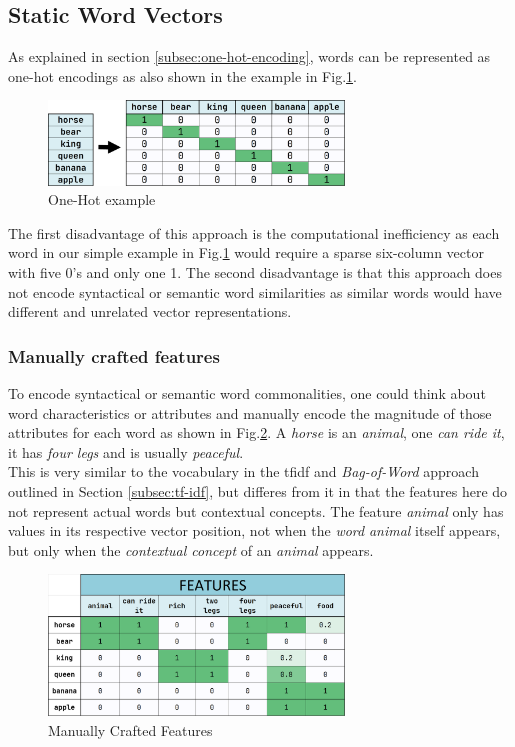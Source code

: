 \subsection{Static Word Vectors}\label{subsec:static-word-vectors}

As explained in section \ref{subsec:one-hot-encoding}, words can be represented as one-hot encodings as also shown in the example in Fig.\ref{fig:onehot}.

\begin{figure}[H]
	\centering
	\includegraphics[width=0.7\textwidth]{Assets/onehot}
	\caption{One-Hot example}
	\label{fig:onehot}
\end{figure}

The first disadvantage of this approach is the computational inefficiency as each word in our simple example in Fig.\ref{fig:onehot} would require a sparse six-column vector with five 0's and only one 1.
The second disadvantage is that this approach does not encode syntactical or semantic word similarities as similar words would have different and unrelated vector representations.

\subsubsection{Manually crafted features}
To encode syntactical or semantic word commonalities, one could think about word characteristics or attributes and manually encode the magnitude of those attributes for each word as shown in Fig.\ref{fig:wordfeaturesmanually}.
A \emph{horse} is an \emph{animal}, one \emph{can ride it}, it has \emph{four legs} and is usually \emph{peaceful}.\\
This is very similar to the \gls{vocabulary} in the \gls{tfidf} and \emph{Bag-of-Word} approach outlined in Section \ref{subsec:tf-idf}, but differes from
it in that the features here do not represent actual words but contextual concepts.
The feature \emph{animal} only has values in its respective vector position, not when the \emph{word} \emph{animal} itself appears, but only when the \emph{contextual concept} of an \emph{animal} appears.

\begin{figure}[H]
	\centering
	\includegraphics[width=0.7\textwidth]{Assets/wordfeaturesmanually}
	\caption{Manually Crafted Features}
	\label{fig:wordfeaturesmanually}
\end{figure}

